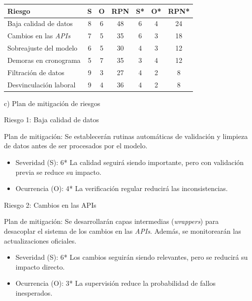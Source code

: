 \documentclass[
11pt, %
]{charter}
\begin{document}
\begin{table}[htpb]
\centering
\begin{tabularx}{\linewidth}{@{}|X|c|c|c|c|c|c|@{}}
\hline
\rowcolor[HTML]{C0C0C0} 
Riesgo & S & O & RPN & S* & O* & RPN* \\ \hline
Baja calidad de datos       & 8  & 6  & 48    & 6   & 4   & 24     \\ \hline
Cambios en las \textit{APIs}       & 7  & 5  & 35    & 6   & 3   & 18     \\ \hline
Sobreajuste del modelo       & 6  & 5  & 30    & 4   & 3   & 12     \\ \hline
Demoras en cronograma       & 5  & 7  & 35    & 3   & 4   & 12     \\ \hline
Filtración de datos       & 9  & 3  & 27    & 4   & 2   & 8     \\ \hline
Desvinculación laboral     & 9  & 4  & 36    & 4   & 2   & 8     \\ \hline
\end{tabularx}%
\end{table}

c) Plan de mitigación de riesgos

Riesgo 1: Baja calidad de datos

Plan de mitigación:
Se establecerán rutinas automáticas de validación y limpieza de datos antes de ser procesados por el modelo.

\begin{itemize}
\item Severidad (S): 6*
La calidad seguirá siendo importante, pero con validación previa se reduce su impacto.

\item Ocurrencia (O): 4*
La verificación regular reducirá las inconsistencias.
\end{itemize}


Riesgo 2: Cambios en las APIs

Plan de mitigación:
Se desarrollarán capas intermedias (\textit{wrappers}) para desacoplar el sistema de los cambios en las \textit{APIs}. Además, se monitorearán las actualizaciones oficiales.

\begin{itemize}
\item Severidad (S): 6*
Los cambios seguirán siendo relevantes, pero se reducirá su impacto directo.

\item Ocurrencia (O): 3*
La supervisión reduce la probabilidad de fallos inesperados.
\end{itemize}
\end{document}
